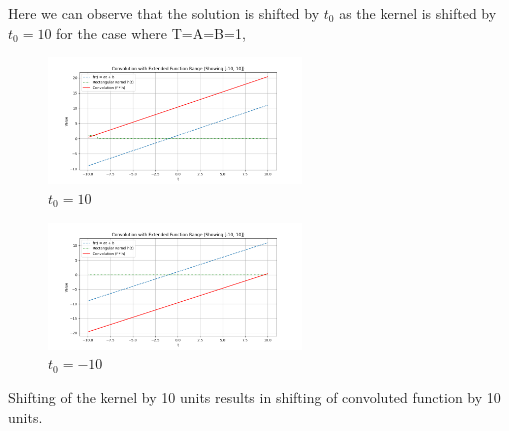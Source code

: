 Here we can observe that the solution is shifted by 
$t_0$ as the kernel is shifted by $t_0=10$ for the case where T=A=B=1,
\begin{figure}[h]
    \centering
    \includegraphics[width=0.6\textwidth]{figsm/5.png}
    \caption{$t_0 = 10$}
    \label{fig:conv_sinc}
\end{figure}
\begin{figure}[h]
    \centering
    \includegraphics[width=0.6\textwidth]{figsm/6.png}
    \caption{$t_0 = -10$}
    \label{fig:conv_sinc}
\end{figure}
Shifting of the kernel by 10 units results in shifting of convoluted function by 10 units.
